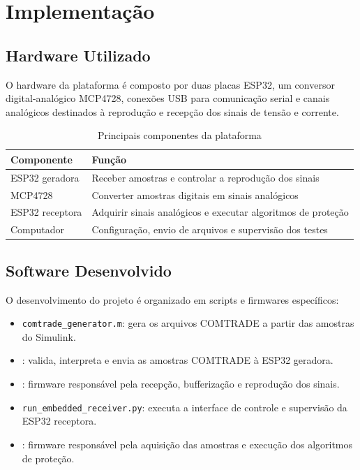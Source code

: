 \chapter{Implementação}

\section{Hardware Utilizado}

O hardware da plataforma é composto por duas placas ESP32, um conversor digital-analógico MCP4728, conexões USB para comunicação serial e canais analógicos destinados à reprodução e recepção dos sinais de tensão e corrente.

\begin{table}[H]
  \centering
  \caption{Principais componentes da plataforma}
  \label{tab:componentes}
  \begin{tabular}{ll}
    \toprule
    Componente & Função \\
    \midrule
    ESP32 geradora & Receber amostras e controlar a reprodução dos sinais \\
    MCP4728 & Converter amostras digitais em sinais analógicos \\
    ESP32 receptora & Adquirir sinais analógicos e executar algoritmos de proteção \\
    Computador & Configuração, envio de arquivos e supervisão dos testes \\
    \bottomrule
  \end{tabular}
\end{table}

\section{Software Desenvolvido}

O desenvolvimento do projeto é organizado em scripts e firmwares específicos:

\begin{itemize}
  \item \texttt{comtrade\_generator.m}: gera os arquivos COMTRADE a partir das amostras do Simulink.
  \item {}: valida, interpreta e envia as amostras COMTRADE à ESP32 geradora.
  \item {}: firmware responsável pela recepção, bufferização e reprodução dos sinais.
  \item \texttt{run\_embedded\_receiver.py}: executa a interface de controle e supervisão da ESP32 receptora.
  \item {}: firmware responsável pela aquisição das amostras e execução dos algoritmos de proteção.
\end{itemize}

